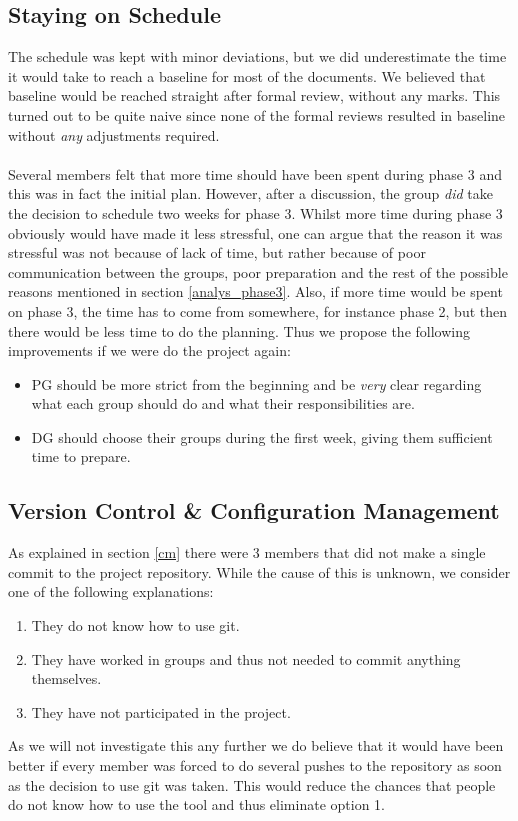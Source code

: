 \documentclass{article}
\begin{document}
    \subsection{Staying on Schedule \label{analyse_schedule}}
        The schedule was kept with minor deviations, but we did underestimate the time it would take
        to reach a baseline for most of the documents. We believed that baseline would be reached straight
        after formal review, without any marks. This turned out to be quite naive since none of the formal reviews resulted in baseline without \emph{any} adjustments required.
        \\ \\
        Several members felt that more time should have been spent during phase 3 and
        this was in fact the initial plan. However, after a discussion, the group \emph{did} take
        the decision to schedule two weeks for phase 3. Whilst more time during phase 3
        obviously would have made it less stressful, one can argue that the reason it was stressful
        was not because of lack of time, but rather because of poor communication between the groups,
        poor preparation and the rest of the possible reasons mentioned in section \ref{analys_phase3}. Also,
        if more time would be spent on phase 3, the time has to come from somewhere, for instance phase 2, but then there
        would be less time to do the planning. Thus we propose the following improvements if we were do the project again:
        \begin{itemize}
            \item PG should be more strict from the beginning and be \emph{very} clear regarding what each group
                    should do and what their responsibilities are. 
            \item DG should choose their groups during the first week, giving them sufficient time to prepare.
        \end{itemize}

    \subsection{Version Control \& Configuration Management}
        As explained in section \ref{cm} there were 3 members that did not make a single
        commit to the project repository. While the cause of this is unknown, we consider
        one of the following explanations:
        \begin{enumerate}
            \item They do not know how to use git.
            \item They have worked in groups and thus not needed to commit anything themselves.
            \item They have not participated in the project.
        \end{enumerate}
        As we will not investigate this any further we do believe that it would have been
        better if every member was forced to do several pushes to the repository as soon
        as the decision to use git was taken. This would reduce the chances that people
        do not know how to use the tool and thus eliminate option 1. 
    
\end{document}
